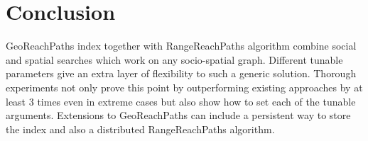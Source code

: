 \section{Conclusion} \label{sec:conclusion}
GeoReachPaths index together with RangeReachPaths algorithm combine social and spatial searches which work on any socio-spatial graph. Different tunable parameters give an extra layer of flexibility to such a generic solution. Thorough experiments not only prove this point by outperforming existing approaches by at least 3 times even in extreme cases but also show how to set each of the tunable arguments. Extensions to GeoReachPaths can include a persistent way to store the index and also a distributed RangeReachPaths algorithm.
